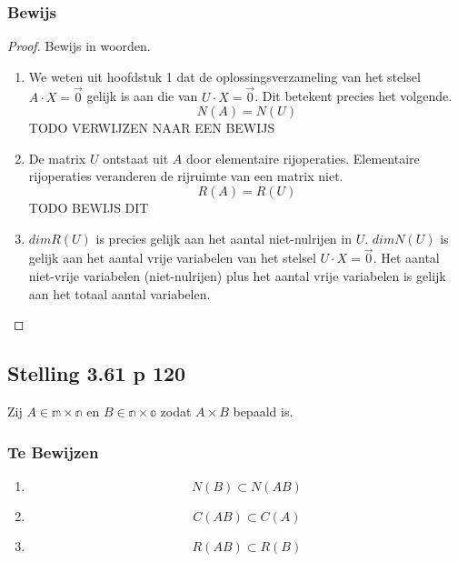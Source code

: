 \documentclass[lineaire_algebra_oplossingen.tex]{subfiles}
\begin{document}
\subsubsection*{Bewijs}
\begin{proof}
Bewijs in woorden.
\begin{enumerate}
\item We weten uit hoofdstuk 1 dat de oplossingsverzameling van het stelsel $A\cdot X = \vec{0}$ gelijk is aan die van $U\cdot X = \vec{0}$. Dit betekent precies het volgende.
\[
N(A) = N(U)
\]
TODO VERWIJZEN NAAR EEN BEWIJS
\item De matrix $U$ ontstaat uit $A$ door elementaire rijoperaties. Elementaire rijoperaties veranderen de rijruimte van een matrix niet. 
\[
R(A) = R(U)
\]
TODO BEWIJS DIT
\item
$dimR(U)$ is precies gelijk aan het aantal niet-nulrijen in $U$.
$dimN(U)$ is gelijk aan het aantal vrije variabelen van het stelsel $U\cdot X = \vec{0}$. Het aantal niet-vrije variabelen (niet-nulrijen) plus het aantal vrije variabelen is gelijk aan het totaal aantal variabelen.
\end{enumerate}
\end{proof}

\subsection{Stelling 3.61 p 120}
Zij $A \in \mathbb{m \times n}$ en $B \in \mathbb{n \times o}$ zodat $A\times B$ bepaald is.
\subsubsection*{Te Bewijzen}
\begin{enumerate}
\item
\[
N(B) \subset N(AB)
\]
\item
\[
C(AB) \subset C(A)
\]
\item
\[ 
R(AB)\subset R(B)
\]
\end{enumerate}
\end{document}
